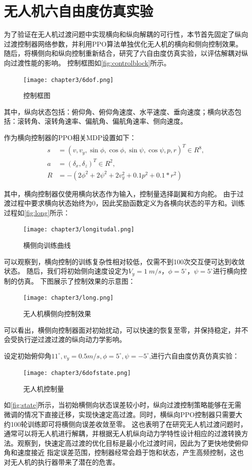 \section{无人机六自由度仿真实验}
为了验证在无人机过渡问题中实现横向和纵向解耦的可行性，本节首先固定了纵向过渡控制器网络参数，并利用PPO算法单独优化无人机的横向和侧向控制效果。
随后，将横侧向和纵向控制重新结合，研究了六自由度仿真实验，以评估解耦对纵向过渡性能的影响。
控制框图如\autoref{fig:controlblock}所示。
\begin{figure}[H]
\centering
\texttt{[image: chapter3/6dof.png]}
\caption{\label{fig:tecs}控制框图}
\label{fig:controlblock}
\end{figure}
其中，纵向状态包括：俯仰角、俯仰角速度、水平速度、垂向速度；横向状态包括：滚转角、滚转角速率、偏航角、偏航角速率、侧向速度。

作为横向控制器的PPO相关MDP设置如下：
\begin{equation}
\begin{aligned}
s &= \left(v,v_{y},\sin \phi , \cos \phi , \sin \psi , \cos \psi ,p, r\right)^{T} \in R^{8}, \\
a &= \left(\delta_{x},\delta_{z}\right)^{T} \in R^{2},\\
R &= -(2 \phi^{2}+2\psi^{2}+2v_{y}^{2}+0.1p^{2}+0.1*r^{2})
\end{aligned}
\end{equation}

其中，横向控制器仅使用横向状态作为输入，控制量选择副翼和方向舵。
由于过渡过程中要求横向状态始终为0，因此奖励函数定义为各横向状态的平方和。训练过程如\autoref{fig:long}所示：
\begin{figure}[htb]
    \centering
    \texttt{[image: chapter3/longitudal.png]}
    \caption{\label{fig:tecs}横侧向训练曲线}
    \label{fig:long}
\end{figure}

可以观察到，横向控制的训练复杂性相对较低，仅需不到100次交互便可达到收敛状态。
随后，我们将初始侧向速度设定为$V_{y}=1 \ m/s$，$\phi=5^{\circ}$，$\psi=5^{\circ}$进行横向控制的仿真。
下图展示了控制效果的示意图：
\begin{figure}[H]
    \centering
    \texttt{[image: chapter3/long.png]}
    \caption{\label{fig:tecs}无人机横侧向控制效果}
    \label{fig:state}
\end{figure}

可以看出，横侧向控制器面对初始扰动，可以快速的恢复至零，并保持稳定，并不会受执行逆过渡过渡的纵向动力学影响。

设定初始俯仰角$11^{\circ},v_{y}=0.5m/s,\phi=5^{\circ},\psi=-5^{\circ}$,进行六自由度仿真仿真实验：
\begin{figure}[htb]
    \centering
    \texttt{[image: chapter3/6dofstate.png]}
    \caption{\label{fig:tecs}无人机控制量}
    \label{fig:action}
\end{figure}
如\autoref{fig:state}所示，当初始横侧向状态误差较小时，纵向过渡控制策略能够在无需微调的情况下直接迁移，实现快速定高过渡。同时，横纵向PPO控制器只需要大约100轮训练即可将横侧向误差收敛至零。
这也表明了在研究无人机过渡问题时，通常可以将无人机进行解耦，并根据无人机纵向动力学特性设计相应的过渡转换方法。观察到，快速定高过渡的优化目标是最小化过渡时间，因此为了更快地使俯仰角和速度接近
指定误差范围，控制器经常会趋于饱和状态，产生高频控制，这也对无人机的执行器带来了潜在的危害。

